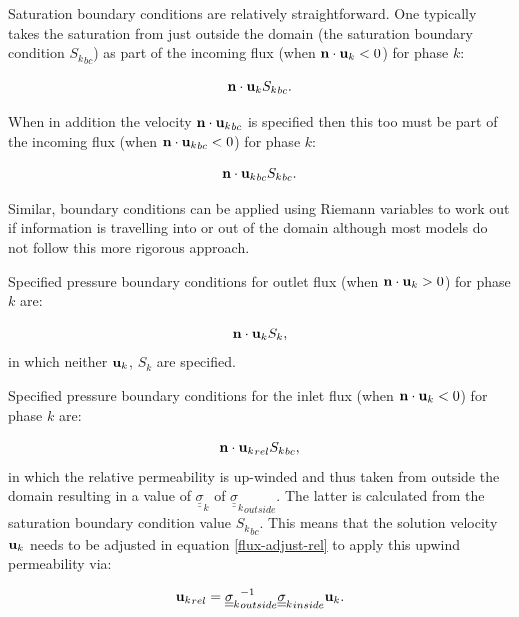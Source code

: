 Saturation boundary conditions are relatively straightforward.
One typically takes the saturation from just outside the domain
(the saturation boundary condition ${S_k}_{bc}$)
as part of the incoming flux
(when ${\bf n}\cdot {\bf u}_k<0$) for phase $k$:

\begin{equation}
{\bf n}\cdot {\bf u}_k {S_k}_{bc} .
\end{equation}

When in addition the velocity
${\bf n}\cdot {{\bf u}_k}_{bc}$ is
specified then this too must be part of the
incoming flux (when ${\bf n}\cdot {{\bf u}_k}_{bc}<0$) for phase $k$:

\begin{equation}
{\bf n}\cdot {{\bf u}_k}_{bc} {S_k}_{bc} .
\end{equation}

Similar, boundary conditions can be applied using Riemann
variables to work out if information is travelling into
or out of the domain although most models do not follow this
more rigorous approach.

Specified pressure boundary conditions for outlet
flux (when ${\bf n}\cdot {\bf u}_k>0$) for phase $k$ are:

\begin{equation}
{\bf n}\cdot {\bf u}_k {S_k},
\end{equation}
in which neither ${\bf u}_k$, ${S_k}$ are specified.

Specified pressure boundary conditions for the inlet
flux (when ${\bf n}\cdot {\bf u}_k<0$) for phase $k$ are:

\begin{equation}
{\bf n}\cdot {{\bf u}_k}_{rel} {S_k}_{bc},
\label{flux-adjust-rel}
\end{equation}
in which the relative permeability is up-winded and thus taken
from outside the domain resulting in a value of ${\underline {\underline \sigma}}_k$ of
${{\underline {\underline \sigma}}_k}_{outside}$. The latter is calculated from
the saturation boundary condition value ${S_k}_{bc}$.
This means that the
solution velocity ${{\bf u}_k}$ needs to be adjusted in
equation \ref{flux-adjust-rel} to apply this upwind permeability
via:

\begin{equation}
{{\bf u}_k}_{rel}={{\underline {\underline \sigma}}_k}_{outside}^{-1}{{\underline {\underline \sigma}}_k}_{inside} {{\bf u}_k}.
\label{u-orig-interface}
\end{equation}

